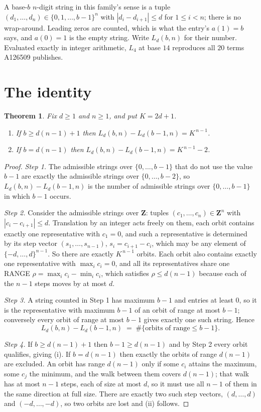 \documentclass[11pt,a4paper]{article}
\theoremstyle{plain}
\newtheorem{theorem}{Theorem}
\theoremstyle{definition}
\begin{document}
A base-$b$ $n$-digit string in this family's sense is a tuple
$(d_1,\dots,d_n)\in\{0,1,\dots,b-1\}^{n}$ with $|d_i-d_{i+1}|\le d$ for $1\le i<n$; there
is no wrap-around. Leading zeros are counted, which is what the entry's $a(1)=b$ says, and
$a(0)=1$ is the empty string. Write $L_d(b,n)$ for their number. Evaluated exactly in integer
arithmetic, $L_{4}$ at base $14$ reproduces all $20$ terms A126509 publishes.

\section{The identity}

\begin{theorem}
Fix $d\ge1$ and $n\ge1$, and put $K=2d+1$.
\begin{enumerate}
\item[(i)] If $b\ge d(n-1)+1$ then $L_d(b,n)-L_d(b-1,n)=K^{\,n-1}$.
\item[(ii)] If $b=d(n-1)$ then $L_d(b,n)-L_d(b-1,n)=K^{\,n-1}-2$.
\end{enumerate}
\end{theorem}

\begin{proof}
\emph{Step 1.} The admissible strings over $\{0,\dots,b-1\}$ that do not use the value $b-1$
are exactly the admissible strings over $\{0,\dots,b-2\}$, so $L_d(b,n)-L_d(b-1,n)$ is the
number of admissible strings over $\{0,\dots,b-1\}$ in which $b-1$ occurs.

\emph{Step 2.} Consider the admissible strings over $\mathbf{Z}$: tuples
$(c_1,\dots,c_n)\in\mathbf{Z}^{n}$ with $|c_i-c_{i+1}|\le d$. Translation by an integer acts
freely on them, each orbit contains exactly one representative with $c_1=0$, and such a
representative is determined by its step vector $(s_1,\dots,s_{n-1})$, $s_i=c_{i+1}-c_i$,
which may be any element of $\{-d,\dots,d\}^{n-1}$. So there are exactly $K^{\,n-1}$ orbits.
Each orbit also contains exactly one representative with $\max_i c_i=0$, and all its
representatives share one RANGE $\rho=\max_ic_i-\min_ic_i$, which satisfies
$\rho\le d(n-1)$ because each of the $n-1$ steps moves by at most $d$.

\emph{Step 3.} A string counted in Step 1 has maximum $b-1$ and entries at least $0$, so it is
the representative with maximum $b-1$ of an orbit of range at most $b-1$; conversely every orbit
of range at most $b-1$ gives exactly one such string. Hence
\[
L_d(b,n)-L_d(b-1,n)\;=\;\#\{\text{orbits of range}\le b-1\} .
\]

\emph{Step 4.} If $b\ge d(n-1)+1$ then $b-1\ge d(n-1)$ and by Step 2 every orbit qualifies,
giving (i). If $b=d(n-1)$ then exactly the orbits of range $d(n-1)$ are excluded. An orbit has
range $d(n-1)$ only if some $c_i$ attains the maximum, some $c_j$ the minimum, and the walk
between them covers $d(n-1)$; that walk has at most $n-1$ steps, each of size at most $d$, so it
must use all $n-1$ of them in the same direction at full size. There are exactly two such step
vectors, $(d,\dots,d)$ and $(-d,\dots,-d)$, so two orbits are lost and (ii) follows.
\end{proof}
\end{document}
